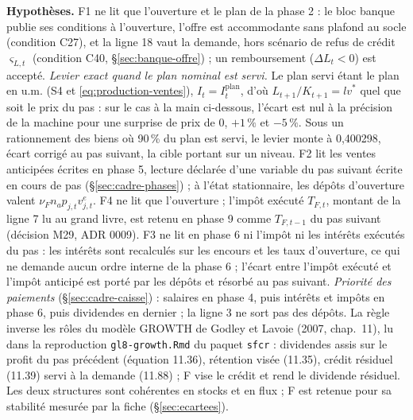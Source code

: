 \documentclass[11pt,a4paper]{article}
\newcommand{\hyp}{\par\noindent\textbf{Hypothèses.} }
\begin{document}
\begin{proposee}
\hyp F1 ne lit que l'ouverture et le plan de la phase 2 : le bloc banque publie ses conditions à l'ouverture, l'offre est accommodante sans plafond au socle (condition C27), et la ligne 18 vaut la demande, hors scénario de refus de crédit $\varsigma_{L,t}$ (condition C40, \S\ref{sec:banque-offre}) ; un remboursement ($\Delta L_t < 0$) est accepté. \emph{Levier exact quand le plan nominal est servi.} Le plan servi étant le plan en u.m. (S4 et \eqref{eq:production-ventes}), $I_t = I^{\mathrm{plan}}_t$, d'où $L_{t+1}/K_{t+1} = \mathit{lv}^\ast$ quel que soit le prix du pas : sur le cas à la main ci-dessous, l'écart est nul à la précision de la machine pour une surprise de prix de 0, $+1\,\%$ et $-5\,\%$. Sous un rationnement des biens où 90\,\% du plan est servi, le levier monte à 0,400298, écart corrigé au pas suivant, la cible portant sur un niveau. F2 lit les ventes anticipées écrites en phase 5, lecture déclarée d'une variable du pas suivant écrite en cours de pas (\S\ref{sec:cadre-phases}) ; à l'état stationnaire, les dépôts d'ouverture valent $\nu_F n_a p_{j,t} v^e_{j,t}$. F4 ne lit que l'ouverture ; l'impôt exécuté $T_{F,t}$, montant de la ligne 7 lu au grand livre, est retenu en phase 9 comme $T_{F,t-1}$ du pas suivant (décision M29, ADR 0009). F3 ne lit en phase 6 ni l'impôt ni les intérêts exécutés du pas : les intérêts sont recalculés sur les encours et les taux d'ouverture, ce qui ne demande aucun ordre interne de la phase 6 ; l'écart entre l'impôt exécuté et l'impôt anticipé est porté par les dépôts et résorbé au pas suivant. \emph{Priorité des paiements} (\S\ref{sec:cadre-caisse}) : salaires en phase 4, puis intérêts et impôts en phase 6, puis dividendes en dernier ; la ligne 3 ne sort pas des dépôts. La règle inverse les rôles du modèle GROWTH de Godley et Lavoie (2007, chap.~11), lu dans la reproduction \nolinkurl{gl8-growth.Rmd} du paquet \texttt{sfcr} : dividendes assis sur le profit du pas précédent (équation 11.36), rétention visée (11.35), crédit résiduel (11.39) servi à la demande (11.88) ; F vise le crédit et rend le dividende résiduel. Les deux structures sont cohérentes en stocks et en flux ; F est retenue pour sa stabilité mesurée par la fiche (\S\ref{sec:ecartees}).

\end{proposee}
\end{document}
